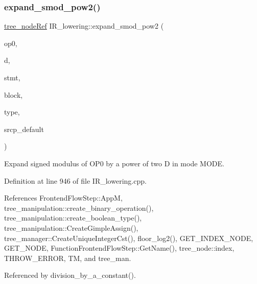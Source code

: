 \subsubsection{\texorpdfstring{expand\+\_\+smod\+\_\+pow2()}{expand\_smod\_pow2()}}
{\footnotesize\ttfamily \hyperlink{tree__node_8hpp_a6ee377554d1c4871ad66a337eaa67fd5}{tree\+\_\+node\+Ref} I\+R\+\_\+lowering\+::expand\+\_\+smod\+\_\+pow2 (\begin{DoxyParamCaption}\item[{\hyperlink{tree__node_8hpp_a6ee377554d1c4871ad66a337eaa67fd5}{tree\+\_\+node\+Ref}}]{op0,  }\item[{unsigned long long int}]{d,  }\item[{const \hyperlink{tree__node_8hpp_a6ee377554d1c4871ad66a337eaa67fd5}{tree\+\_\+node\+Ref}}]{stmt,  }\item[{const bloc\+Ref}]{block,  }\item[{\hyperlink{tree__node_8hpp_a6ee377554d1c4871ad66a337eaa67fd5}{tree\+\_\+node\+Ref} \&}]{type,  }\item[{const std\+::string \&}]{srcp\+\_\+default }\end{DoxyParamCaption})\hspace{0.3cm}{\ttfamily [private]}}



Expand signed modulus of O\+P0 by a power of two D in mode M\+O\+DE. 



Definition at line 946 of file I\+R\+\_\+lowering.\+cpp.



References Frontend\+Flow\+Step\+::\+AppM, tree\+\_\+manipulation\+::create\+\_\+binary\+\_\+operation(), tree\+\_\+manipulation\+::create\+\_\+boolean\+\_\+type(), tree\+\_\+manipulation\+::\+Create\+Gimple\+Assign(), tree\+\_\+manager\+::\+Create\+Unique\+Integer\+Cst(), floor\+\_\+log2(), G\+E\+T\+\_\+\+I\+N\+D\+E\+X\+\_\+\+N\+O\+DE, G\+E\+T\+\_\+\+N\+O\+DE, Function\+Frontend\+Flow\+Step\+::\+Get\+Name(), tree\+\_\+node\+::index, T\+H\+R\+O\+W\+\_\+\+E\+R\+R\+OR, TM, and tree\+\_\+man.



Referenced by division\+\_\+by\+\_\+a\+\_\+constant().

